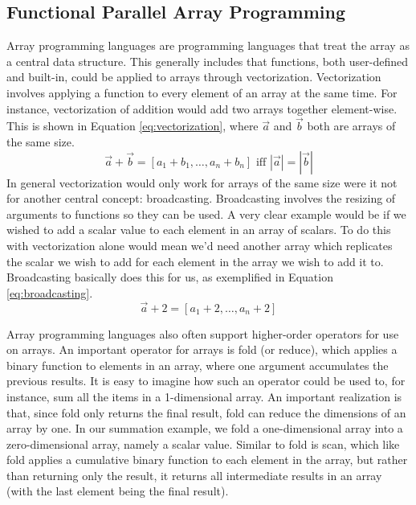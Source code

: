     \subsection{Functional Parallel Array Programming} \label{sec:bg_array}
        Array programming languages are programming languages that treat the array as a central data structure.
        This generally includes that functions, both user-defined and built-in, could be applied to arrays through vectorization.
        Vectorization involves applying a function to every element of an array at the same time.
        For instance, vectorization of addition would add two arrays together element-wise.
        This is shown in Equation \ref{eq:vectorization}, where $\vec{a}$ and $\vec{b}$ both are arrays of the same size.
        \begin{equation} \label{eq:vectorization}
            \vec{a}+\vec{b}=[a_1+b_1,\dots,a_n+b_n]\text{ iff }|\vec{a}|=|\vec{b}|
        \end{equation}
        In general vectorization would only work for arrays of the same size were it not for another central concept: broadcasting.
        Broadcasting involves the resizing of arguments to functions so they can be used.
        A very clear example would be if we wished to add a scalar value to each element in an array of scalars.
        To do this with vectorization alone would mean we'd need another array which replicates the scalar we wish to add for each element in the array we wish to add it to.
        Broadcasting basically does this for us, as exemplified in Equation \ref{eq:broadcasting}.
        \begin{equation} \label{eq:broadcasting}
            \vec{a}+2=[a_1+2,\dots,a_n+2]
        \end{equation}
        
        Array programming languages also often support higher-order operators for use on arrays.
        An important operator for arrays is fold (or reduce), which applies a binary function to elements in an array, where one argument accumulates the previous results.
        It is easy to imagine how such an operator could be used to, for instance, sum all the items in a 1-dimensional array.
        An important realization is that, since fold only returns the final result, fold can reduce the dimensions of an array by one.
        In our summation example, we fold a one-dimensional array into a zero-dimensional array, namely a scalar value.
        Similar to fold is scan, which like fold applies a cumulative binary function to each element in the array, but rather than returning only the result, it returns all intermediate results in an array (with the last element being the final result).

